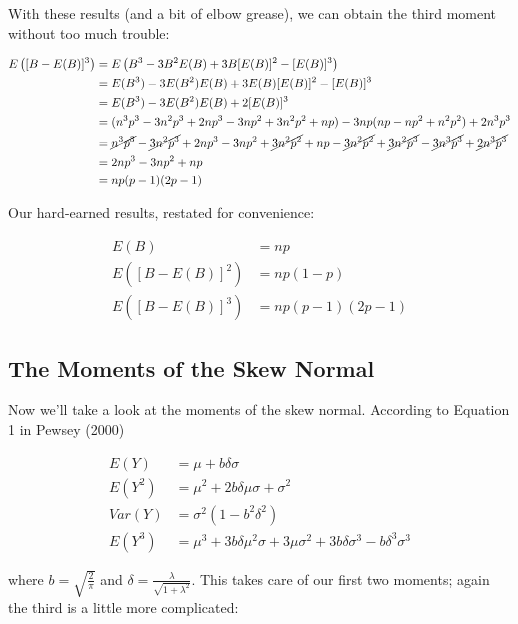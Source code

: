 \documentclass{article}
\begin{document}
With these results (and a bit of elbow grease), we can obtain the third moment
without too much trouble:

\begin{align*}
  E \left( [B - E(B)]^3 \right) &= E \left( B^3 - 3B^2 E(B) + 3B [E(B)]^2 - [E(B)]^3 \right) \\
  &= E(B^3) - 3 E(B^2) E(B) + 3 E(B) [E(B)]^2 - [E(B)]^3 \\
  &= E(B^3) - 3 E(B^2) E(B) + 2 [E(B)]^3 \\
  &= (n^3p^3 - 3n^2p^3 + 2np^3 - 3np^2 + 3n^2p^2 + np) - 3np(np - np^2 + n^2p^2) + 2n^3p^3 \\
  &= \cancel{n^3p^3} - \cancel{3n^2p^3} + 2np^3 - 3np^2 + \cancel{3n^2p^2} + np - \cancel{3n^2p^2} + \cancel{3n^2p^3} - \cancel{3n^3p^3} + \cancel{2n^3p^3} \\
  &= 2np^3 - 3np^2 + np \\
  &= np(p-1)(2p-1)
\end{align*}

Our hard-earned results, restated for convenience:

\begin{align}
  E(B) &= np \nonumber \\
  E([B - E(B)]^2) &= np(1-p) \\
  E([B - E(B)]^3) &= np(p-1)(2p-1) \nonumber
\end{align}

\subsection{The Moments of the Skew Normal}

Now we'll take a look at the moments of the skew normal. According to Equation
1 in Pewsey (2000)

\begin{align*}
  E(Y) &= \mu + b \delta \sigma \\
  E(Y^2) &= \mu^2 + 2b \delta \mu \sigma + \sigma^2 \\
  Var(Y) &= \sigma^2 (1 - b^2 \delta^2) \\
  E(Y^3) &= \mu^3 + 3 b \delta \mu^2 \sigma + 3 \mu \sigma^2 + 3 b \delta \sigma^3 - b \delta^3 \sigma^3 \nonumber
\end{align*}

where $b = \sqrt{\frac{2}{\pi}}$ and $\delta = \frac{\lambda}{\sqrt{1 +
\lambda^2}}$. This takes care of our first two moments; again the third is a
little more complicated:
\end{document}
